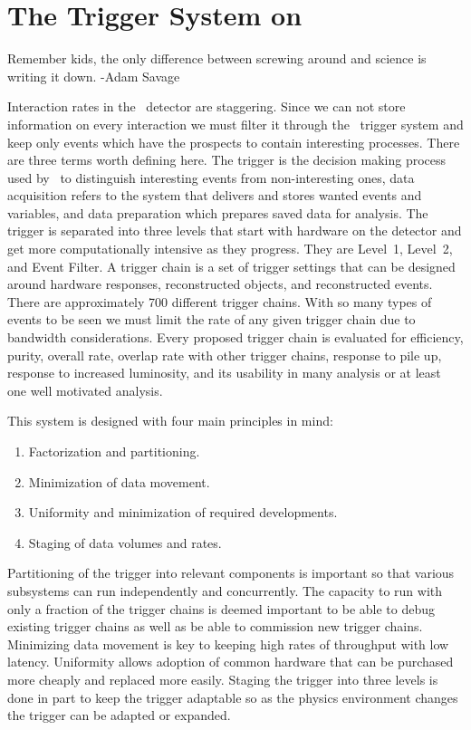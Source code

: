 
\chapter{The Trigger System on~\atlas}
\label{SECTION-TRIGGERS}

Remember kids, the only difference between screwing around and science is writing it down. -Adam Savage

\vspace{5mm} %

Interaction rates in the \atlas~detector are staggering. Since we can not store information on every interaction we must filter it through the \atlas~trigger system and keep only events which have the prospects to contain interesting processes. There are three terms worth defining here. The trigger is the decision making process used by \atlas~to distinguish interesting events from non-interesting ones, data acquisition refers to the system that delivers and stores wanted events and variables, and data preparation which prepares saved data for analysis. The trigger is separated into three levels that start with hardware on the detector and get more computationally intensive as they progress. They are Level~1, Level~2, and Event Filter. A trigger chain is a set of trigger settings that can be designed around hardware responses, reconstructed objects, and reconstructed events. There are approximately 700 different trigger chains. With so many types of events to be seen we must limit the rate of any given trigger chain due to bandwidth considerations. Every proposed trigger chain is evaluated for efficiency, purity, overall rate, overlap rate with other trigger chains, response to pile up, response to increased luminosity, and its usability in many analysis or at least one well motivated analysis. 

This system is designed with four main principles in mind: 

\begin{enumerate}
\item{Factorization and partitioning.}
\item{Minimization of data movement.}
\item{Uniformity and minimization of required developments.}
\item{Staging of data volumes and rates.}
\end{enumerate}

Partitioning of the trigger into relevant components is important so that various subsystems can run independently and concurrently. The capacity to run with only a fraction of the trigger chains is deemed important to be able to debug existing trigger chains as well as be able to commission new trigger chains. Minimizing data movement is key to keeping high rates of throughput with low latency. Uniformity allows adoption of common hardware that can be purchased more cheaply and replaced more easily. Staging the trigger into three levels is  done in part to keep the trigger adaptable so as the physics environment changes the trigger can be adapted or expanded. 

